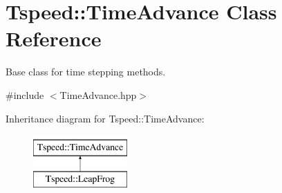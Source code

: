 \hypertarget{classTspeed_1_1TimeAdvance}{\section{Tspeed\-:\-:Time\-Advance Class Reference}
\label{classTspeed_1_1TimeAdvance}
}


Base class for time stepping methods.  




{\ttfamily \#include $<$Time\-Advance.\-hpp$>$}

Inheritance diagram for Tspeed\-:\-:Time\-Advance\-:\begin{figure}[H]
\begin{center}
\leavevmode
\includegraphics[height=2.000000cm]{classTspeed_1_1TimeAdvance}
\end{center}
\end{figure}
